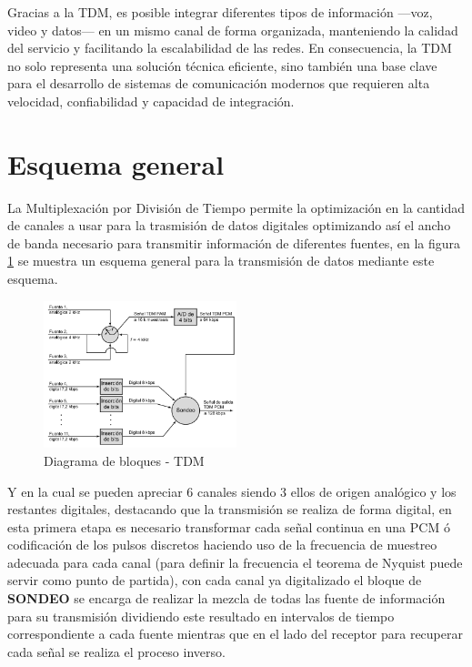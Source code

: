 \documentclass[conference]{IEEEtran}
\begin{document}
	Gracias a la TDM, es posible integrar diferentes tipos de información —voz, video y datos— en un mismo canal de forma organizada, manteniendo la calidad del servicio y facilitando la escalabilidad de las redes. En consecuencia, la TDM no solo representa una solución técnica eficiente, sino también una base clave para el desarrollo de sistemas de comunicación modernos que requieren alta velocidad, confiabilidad y capacidad de integración.
	
	\section{Esquema general}
	
	La Multiplexación por División de Tiempo permite la optimización en la cantidad de canales a usar para la trasmisión de datos digitales optimizando así el ancho de banda necesario para transmitir información de diferentes fuentes, en la figura \ref{fig:pcm-blocks} se muestra un esquema general para la transmisión de datos mediante este esquema.
	
	\begin{figure}[h]
		\centering
		\includegraphics[width=0.5\textwidth]{media/pcm-blocks}
		\caption{Diagrama de bloques - TDM}
		\label{fig:pcm-blocks}
	\end{figure}
	
	Y en la cual se pueden apreciar 6 canales siendo 3 ellos de origen analógico y los restantes digitales, destacando que la transmisión se realiza de forma digital, en esta primera etapa es necesario transformar cada señal continua en una PCM ó  codificación de los pulsos discretos haciendo uso de la frecuencia de muestreo adecuada para cada canal (para definir la frecuencia el teorema de Nyquist puede servir como punto de partida), con cada canal ya digitalizado el bloque de \textbf{SONDEO} \cite{stallings2004comunicaciones} se encarga de realizar la mezcla de todas las fuente de información para su transmisión dividiendo este resultado en intervalos de tiempo correspondiente a cada fuente mientras que en el lado del receptor para recuperar cada señal se realiza el proceso inverso.
	
\end{document}
